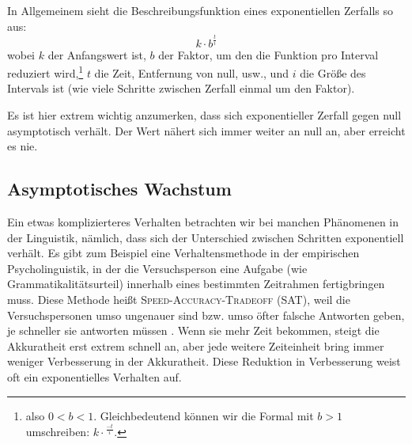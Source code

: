 \documentclass[a4paper,12pt,oneside,leqno]{scrartcl}%
\newcommand{\terminus}[1]{\textsc{#1}}
\begin{document}
In Allgemeinem sieht die Beschreibungsfunktion eines exponentiellen Zerfalls so aus:
\begin{equation}
k\cdot{}b^{\frac{t}{i}}\label{eq:expzerfall}
\end{equation}
wobei $k$ der Anfangswert ist, $b$ der Faktor, um den die Funktion pro Interval reduziert wird,\footnote{also $0<b<1$. Gleichbedeutend können wir die Formal mit $b>1$ umschreiben: $k\cdot{}^{\frac{-t}{i}}$.} $t$ die Zeit, Entfernung von null, usw., und $i$ die Größe des Intervals ist (wie viele Schritte zwischen Zerfall einmal um den Faktor).

Es ist hier extrem wichtig anzumerken, dass sich exponentieller Zerfall gegen null asymptotisch verhält.  
Der Wert nähert sich immer weiter an null an, aber erreicht es nie. 

\subsection{Asymptotisches Wachstum}\label{sec:expasymptot}
Ein etwas komplizierteres Verhalten betrachten wir bei manchen Phänomenen in der Linguistik, nämlich, dass sich der Unterschied zwischen Schritten exponentiell verhält.  
Es gibt zum Beispiel eine Verhaltensmethode in der empirischen Psycholinguistik, in der die Versuchsperson eine Aufgabe (wie Grammatikalitätsurteil) innerhalb eines bestimmten Zeitrahmen fertigbringen muss.  
Diese Methode heißt \terminus{Speed-Accuracy-Tradeoff (SAT)}, weil die Versuchspersonen umso ungenauer sind bzw. umso öfter falsche Antworten geben, je schneller sie antworten müssen \citep{reed1973a,wickelgren1977a}.  
Wenn sie mehr Zeit bekommen, steigt die Akkuratheit erst extrem schnell an, aber jede weitere Zeiteinheit bring immer weniger Verbesserung in der Akkuratheit.  Diese Reduktion in Verbesserung weist oft ein exponentielles Verhalten auf. 
\end{document}
